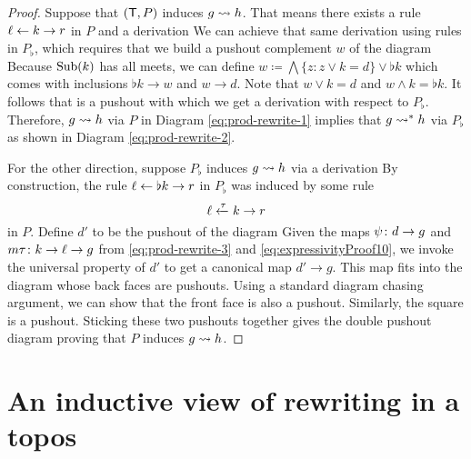 \documentclass{amsart}
\begin{document}
\begin{proof}
  Suppose that $ ( \mathsf{T},P ) $ induces
  $ g \rightsquigarrow h $. That means there exists a
  rule $ \ell \leftarrow k \to r $ in $ P $ and a
  derivation 
  We can achieve that same derivation using rules
  in $ P_\flat $, which requires that we build a
  pushout complement $ w $ of the diagram
   Because
  $ \operatorname{Sub} ( k )$ has all meets, we can define
  $ w \coloneqq \bigwedge \{ z \colon z \vee k = d
  \} \vee \flat k$ which comes with inclusions
  $ \flat k \to w $ and $ w \to d $.  Note that
  $ w \vee k = d $ and $ w \wedge k = \flat k
  $. It follows that
   is a
  pushout with which we get a derivation
   with
  respect to $ P_\flat $.  Therefore,
  $ g \rightsquigarrow h $ via $ P $ in Diagram
  \eqref{eq:prod-rewrite-1} implies that
  $ g \rightsquigarrow^\ast h $ via $ P_\flat $ as shown in
  Diagram \eqref{eq:prod-rewrite-2}.

  For the other direction, suppose $ P_\flat $
  induces $ g \rightsquigarrow h $ via a derivation
   By
  construction, the rule
  $ \ell \leftarrow \flat k \to r $ in $ P_\flat $ was
  induced by some rule
  \begin{equation}\label{eq:expressivityProof10}
    \ell \xleftarrow{\tau} k \to r
  \end{equation}
  in $ P $. Define $ d' $ to be the pushout of the
  diagram 
  Given the maps $ \psi \colon d \to g $ and
  $ m \tau \colon k \to \ell \to g$ from
  \eqref{eq:prod-rewrite-3} and
  \eqref{eq:expressivityProof10}, we invoke the
  universal property of $ d' $ to get a canonical
  map $ d' \to g $. This map fits into the diagram
   whose back
  faces are pushouts. Using a standard diagram
  chasing argument, we can show that the front
  face is also a pushout.  Similarly, the square
   is a
  pushout.  Sticking these two pushouts together
  gives the double pushout diagram
   proving
  that $ P $ induces $ g \rightsquigarrow h $.
\end{proof}



\section{An inductive view of rewriting in a topos}
\label{sec:charRewrRelat}
\end{document}
